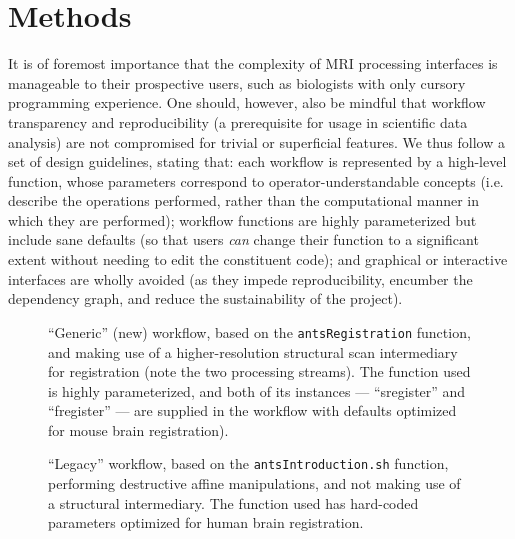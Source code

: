 \section{Methods}
It is of foremost importance that the complexity of MRI processing interfaces is manageable to their prospective users, such as biologists with only cursory programming experience.
One should, however, also be mindful that workflow transparency and reproducibility (a prerequisite for usage in scientific data analysis) are not compromised for trivial or superficial features. 
We thus follow  a set of design guidelines, stating that:
each workflow is represented by a high-level function, whose parameters correspond to operator-understandable concepts (i.e. describe the operations performed, rather than the computational manner in which they are performed); 
workflow functions are highly parameterized but include sane defaults (so that users \textit{can} change their function to a significant extent without needing to edit the constituent code);
and graphical or interactive interfaces are wholly avoided (as they impede reproducibility, encumber the dependency graph, and reduce the sustainability of the project).

\begin{figure*}[h!]
	\begin{subfigure}{.66\textwidth}
		\centering
		\vspace{.55em}
		\caption{
			“Generic” (new) workflow, based on the \textcolor{mg}{\texttt{antsRegistration}} function, and  making use of a higher-resolution structural scan intermediary for registration (note the two processing streams).
			The function used is highly parameterized, and both of its instances --- “s\niceus register” and “f\niceus register” --- are supplied in the workflow with defaults optimized for mouse brain registration).
			}
		\label{fig:wfgg}
	\end{subfigure}\hfill
	\begin{subfigure}{.31\textwidth}
		\centering
		\caption{
			“Legacy” workflow, based on the \textcolor{mg}{\texttt{antsIntroduction.sh}} function, performing destructive affine manipulations, and not making use of a structural intermediary.
			The function used has hard-coded parameters optimized for human brain registration.
			}
		\label{fig:wfgl}
	\end{subfigure}
	\caption{
		Directed acyclic graphs depicting the two alternate MRI registration workflows and their constituent processing steps.
		The package correspondence of each processing node is appended in parantheses to the node name.
		The “utility” indication corresponds to nodes based on Python functions specific to the workflow, distributed alongside it, and dynamically wrapped via Nipype.
		The “extra\niceus interfaces” indication corresponds to nodes using explicitly defined Nipype-style interfaces, which are specific to the workflow and distributed alongside it.
		}
	\label{fig:wfg}
\end{figure*}

